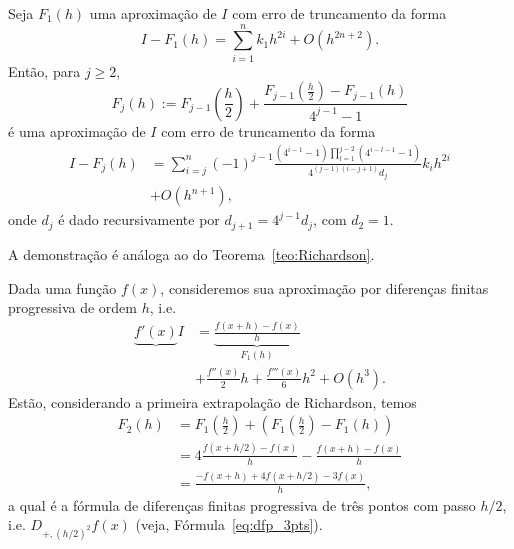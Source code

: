 \begin{corol}
  Seja $F_1(h)$ uma aproximação de $I$ com erro de truncamento da forma
  \begin{equation}
    I-F_1(h) = \sum_{i=1}^n k_1h^{2i} + O(h^{2n+2}).
  \end{equation}
Então, para $j\geq 2$,
\begin{equation}
  F_j(h) := F_{j-1}\left(\frac{h}{2}\right) + \frac{F_{j-1}\left(\frac{h}{2}\right) - F_{j-1}(h)}{4^{j-1}-1}
\end{equation}
é uma aproximação de $I$ com erro de truncamento da forma
\begin{align}
  I-F_{j}(h) &= \sum_{i=j}^n (-1)^{j-1}\frac{\left(4^{i-1}-1\right)\prod_{l=1}^{j-2}\left(4^{i-l-1}-1\right)}{4^{(j-1)(i-j+1)}d_j}k_ih^{2i} \nonumber \\
           & + O(h^{n+1}),
\end{align}
onde $d_{j}$ é dado recursivamente por $d_{j+1}=4^{j-1}d_j$, com $d_2=1$.
\end{corol}
\begin{dem}
  A demonstração é análoga ao do Teorema~\ref{teo:Richardson}.
\end{dem}

\begin{ex}
  Dada uma função $f(x)$, consideremos sua aproximação por diferenças finitas progressiva de ordem $h$, i.e.
  \begin{align}
    \underbrace{f'(x)}{I} &= \underbrace{\frac{f(x+h)-f(x)}{h}}_{F_1(h)}\nonumber\\
    &+ \frac{f''(x)}{2}h + \frac{f'''(x)}{6}h^2 + O(h^3).
  \end{align}
Estão, considerando a primeira extrapolação de Richardson, temos
\begin{align}
  F_2(h) &= F_1\left(\frac{h}{2}\right) + \left(F_1\left(\frac{h}{2}\right) - F_1(h)\right)\\
  &= 4\frac{f(x+h/2)-f(x)}{h} - \frac{f(x+h)-f(x)}{h}\\
  &= \frac{-f(x+h)+4f(x+h/2)-3f(x)}{h},
\end{align}
a qual é a fórmula de diferenças finitas progressiva de três pontos com passo $h/2$, i.e. $D_{+,(h/2)^2}f(x)$ (veja, Fórmula~\eqref{eq:dfp_3pts}).
\end{ex}

